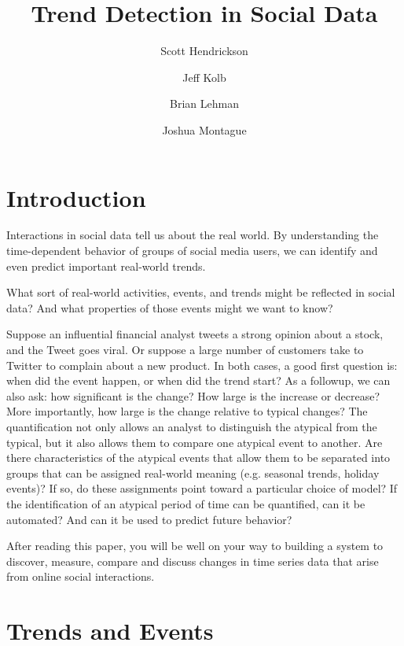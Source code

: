 \documentclass{article}
\title{Trend Detection in Social Data}
\author[]{Scott Hendrickson}
\author[]{Jeff Kolb}
\author[]{Brian Lehman}
\author[]{Joshua Montague}
\affil[]{ \Large{Twitter, Inc.} }
\begin{document}
\maketitle

\frenchspacing

\section{Introduction}
\label{intro}

Interactions in social data tell us about the real world. By
understanding the time-dependent behavior of groups of social media users, we
can identify and even predict important real-world trends. 

What sort of real-world activities, events, and trends might be reflected in
social data? And what properties of those events might we want to know?

Suppose an influential financial analyst tweets a strong opinion about a stock,
and the Tweet goes viral. Or suppose a large number of customers take to
Twitter to complain about a new product. In both cases, a good first question
is: when did the event happen, or when did the trend start? As a followup, we
can also ask: how significant is the change? How large is the increase or
decrease? More importantly, how large is the change relative to typical
changes? The quantification not only allows an analyst to distinguish the
atypical from the typical, but it also allows them to compare one atypical
event to another. Are there characteristics of the atypical events that allow
them to be separated into groups that can be assigned real-world meaning (e.g.
seasonal trends, holiday events)? If so, do these assignments point toward a
particular choice of model? If the identification of an atypical period of time
can be quantified, can it be automated? And can it be used to predict future
behavior?

After reading this paper, you will be well on your way to building a system to
discover, measure, compare and discuss changes in time series data that arise
from online social interactions.

\section{Trends and Events}  \label{definitions}
\end{document}
